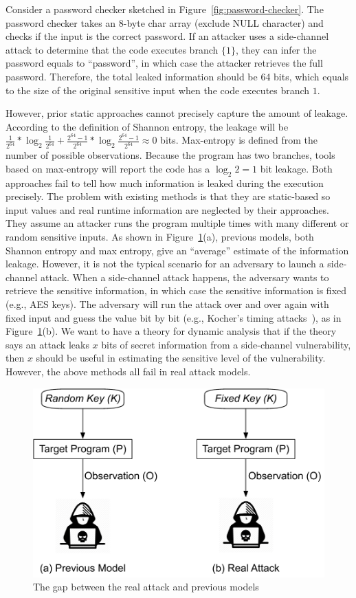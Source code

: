 Consider a password checker sketched in Figure~\ref{fig:password-checker}.
The password checker takes an 8-byte char array (exclude \textsf{NULL} character)
and checks if the input is the correct password. If an attacker uses a side-channel attack to determine that the code executes branch
$\{{1\}}$, they can infer the password equals to
``password'', in which case the attacker retrieves the full password.
Therefore, the total leaked information should be 64 bits, which equals to the
size of the original sensitive input when the code executes branch
$1$.

However, prior static approaches cannot precisely capture the amount of leakage. According to the definition of Shannon entropy, the leakage will be
$\frac{1}{2^{64}}*\log_{2}\frac{1}{2^{64}} + \frac{2^{64}-1}{2^{64}}
    *\log_{2}\frac{2^{64}-1}{2^{64}} \approx 0$ bits. Max-entropy is defined from the
number of possible observations. Because the program has two
branches, tools based on max-entropy will report the code has a $\log_2{2} = 1$
bit leakage.
Both approaches fail to tell how much information is leaked during the execution
precisely. The problem with existing methods is that they are static-based so
input values and real runtime information are neglected by their approaches.
They assume an attacker runs
the program multiple times with many different or random sensitive inputs. As
shown in Figure~\ref{fig:gap}(a), previous models, both Shannon entropy and max
entropy, give an ``average'' estimate of the information leakage. However, it is
not the typical scenario for an adversary to launch a side-channel attack. When
a side-channel attack happens, the adversary wants to retrieve the sensitive
information, in which case the sensitive information is fixed (e.g., AES keys).
The adversary will run the attack over and over again with fixed input and
guess the value bit by
bit (e.g., Kocher's timing attacks~\cite{kocher1996timing}), as in Figure~\ref{fig:gap}(b). We want to have a
theory for dynamic analysis that if the theory says an attack leaks $x$ bits of
secret information from a side-channel vulnerability, then $x$ should be useful
in estimating the sensitive level of the vulnerability. However, the above
methods all fail in real attack models. 
\begin{figure}
    \centering
    \includegraphics[width=.65\columnwidth]{./figures/chapter4/RA.pdf}
    \caption{The gap between the real attack and previous models}\label{fig:gap}
\end{figure}

